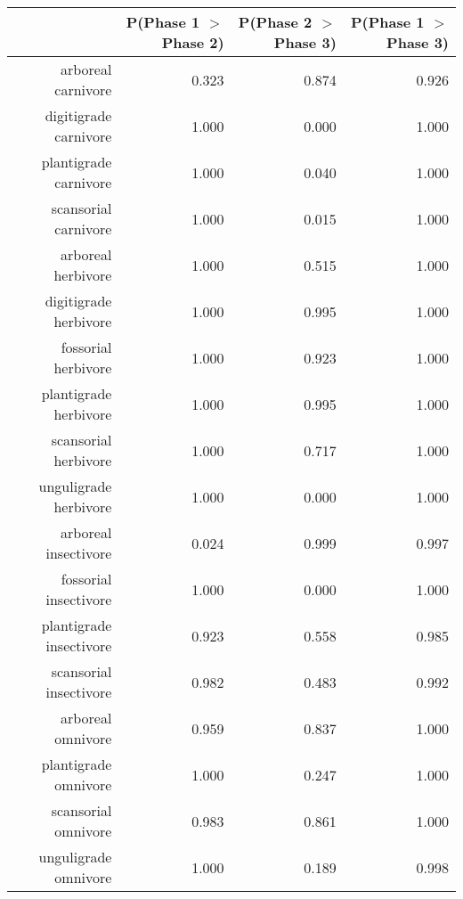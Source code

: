 \begin{table}[ht]
\centering
\begin{tabular}{rrrr}
  \hline
 & P(Phase 1 $>$ Phase 2) & P(Phase 2 $>$ Phase 3) & P(Phase 1 $>$ Phase 3) \\ 
  \hline
arboreal carnivore & 0.323 & 0.874 & 0.926 \\ 
  digitigrade carnivore & 1.000 & 0.000 & 1.000 \\ 
  plantigrade carnivore & 1.000 & 0.040 & 1.000 \\ 
  scansorial carnivore & 1.000 & 0.015 & 1.000 \\ 
  arboreal herbivore & 1.000 & 0.515 & 1.000 \\ 
  digitigrade herbivore & 1.000 & 0.995 & 1.000 \\ 
  fossorial herbivore & 1.000 & 0.923 & 1.000 \\ 
  plantigrade herbivore & 1.000 & 0.995 & 1.000 \\ 
  scansorial herbivore & 1.000 & 0.717 & 1.000 \\ 
  unguligrade herbivore & 1.000 & 0.000 & 1.000 \\ 
  arboreal insectivore & 0.024 & 0.999 & 0.997 \\ 
  fossorial insectivore & 1.000 & 0.000 & 1.000 \\ 
  plantigrade insectivore & 0.923 & 0.558 & 0.985 \\ 
  scansorial insectivore & 0.982 & 0.483 & 0.992 \\ 
  arboreal omnivore & 0.959 & 0.837 & 1.000 \\ 
  plantigrade omnivore & 1.000 & 0.247 & 1.000 \\ 
  scansorial omnivore & 0.983 & 0.861 & 1.000 \\ 
  unguligrade omnivore & 1.000 & 0.189 & 0.998 \\ 
   \hline
\end{tabular}
\label{tab:occur_plant}
\end{table}
